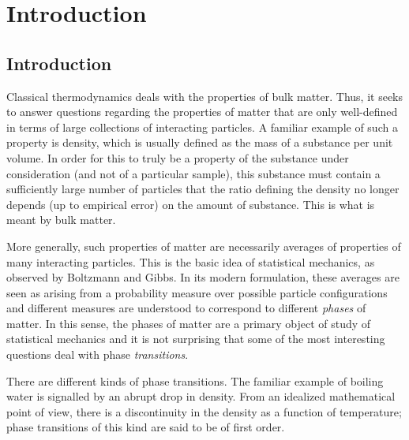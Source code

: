 
\chapter{Introduction}


\section{Introduction}

Classical thermodynamics deals with the properties of bulk matter. Thus, it seeks
to answer questions regarding the properties of matter that are only well-defined
in terms of large collections of interacting particles. A familiar example of
such a property is density, which is usually defined as the mass of a substance
per unit volume. In order for this to truly be a property of the substance under
consideration (and not of a particular sample), this substance must contain a
sufficiently large number of particles that the ratio defining the density
no longer depends (up to empirical error) on the amount of substance. This is
what is meant by bulk matter.

More generally, such properties of matter are necessarily averages of properties
of many interacting particles. This is the basic idea of statistical mechanics,
as observed by Boltzmann and Gibbs. In its modern formulation, these averages
are seen as arising from a probability measure over possible particle configurations
and different measures are understood to correspond to different \emph{phases}
of matter. In this sense, the phases of matter are a primary object of study
of statistical mechanics and it is not surprising that some of the most interesting
questions deal with phase \emph{transitions}.

There are different kinds of phase transitions. The familiar example of boiling
water is signalled by an abrupt drop in density. From an idealized mathematical
point of view, there is a discontinuity in the density as a function of temperature;
phase transitions of this kind are said to be of first order.

